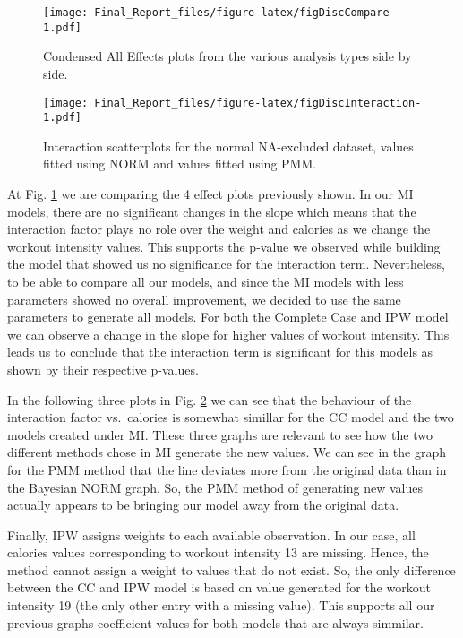 \documentclass[]{article}
\theoremstyle{definition}
\theoremstyle{definition}
\theoremstyle{definition}
\theoremstyle{remark}
\begin{document}
\begin{figure}[htbp]
\centering
\texttt{[image: Final\_Report\_files/figure-latex/figDiscCompare-1.pdf]}
\caption{\label{fig:figDiscCompare}\label{fig:DiscCompare}Condensed All
Effects plots from the various analysis types side by side.}
\end{figure}

\begin{figure}[htbp]
\centering
\texttt{[image: Final\_Report\_files/figure-latex/figDiscInteraction-1.pdf]}
\caption{\label{fig:figDiscInteraction}\label{fig:DiscInteraction}Interaction
scatterplots for the normal NA-excluded dataset, values fitted using
NORM and values fitted using PMM.}
\end{figure}

At Fig. \ref{fig:DiscCompare} we are comparing the 4 effect plots
previously shown. In our MI models, there are no significant changes in
the slope which means that the interaction factor plays no role over the
weight and calories as we change the workout intensity values. This
supports the p-value we observed while building the model that showed us
no significance for the interaction term. Nevertheless, to be able to
compare all our models, and since the MI models with less parameters
showed no overall improvement, we decided to use the same parameters to
generate all models. For both the Complete Case and IPW model we can
observe a change in the slope for higher values of workout intensity.
This leads us to conclude that the interaction term is significant for
this models as shown by their respective p-values.

In the following three plots in Fig. \ref{fig:DiscInteraction} we can
see that the behaviour of the interaction factor vs.~calories is
somewhat simillar for the CC model and the two models created under MI.
These three graphs are relevant to see how the two different methods
chose in MI generate the new values. We can see in the graph for the PMM
method that the line deviates more from the original data than in the
Bayesian NORM graph. So, the PMM method of generating new values
actually appears to be bringing our model away from the original data.

Finally, IPW assigns weights to each available observation. In our case,
all calories values corresponding to workout intensity 13 are missing.
Hence, the method cannot assign a weight to values that do not exist.
So, the only difference between the CC and IPW model is based on value
generated for the workout intensity 19 (the only other entry with a
missing value). This supports all our previous graphs coefficient values
for both models that are always simmilar.
\end{document}
